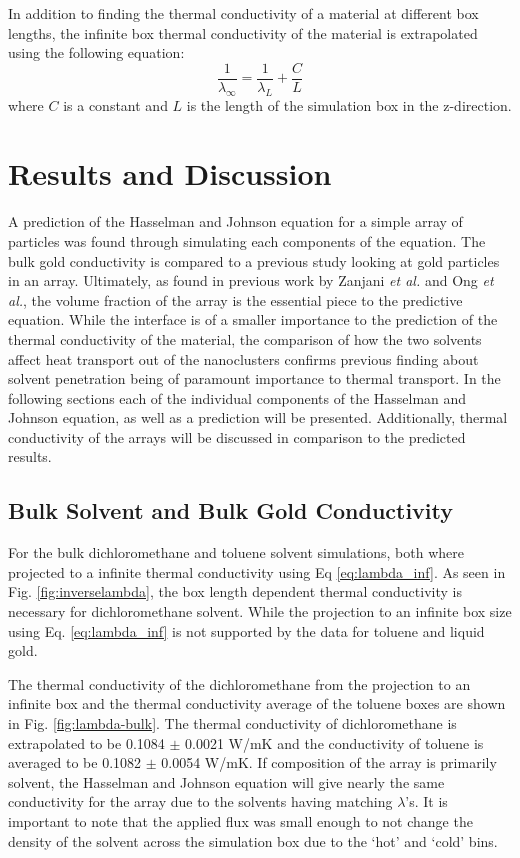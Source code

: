 In addition to finding the thermal conductivity of a material at different box lengths, the infinite box thermal conductivity of the material is extrapolated using the following equation:
\begin{equation}
    \frac{1}{\lambda_{\infty}}= \frac{1}{\lambda_L} +\frac{C}{L}
    \label{eq:lambda_inf}
\end{equation}
where $C$ is a constant and $L$ is the length of the simulation box in the z-direction.\cite{Hannah2015} 

\section{Results and Discussion}
A prediction of the Hasselman and Johnson equation for a simple array of  particles was found through simulating each components of the equation.
The bulk gold conductivity is compared to a previous study looking at gold particles in an array. 
Ultimately, as found in previous work by Zanjani \textit{et al.}\cite{Zanjani2014} and Ong \textit{et al.}\cite{Ong:2014yq}, the volume fraction of the array is the essential piece to the predictive equation.
While the interface is of a smaller importance to the prediction of the thermal conductivity of the material, the comparison of how the two solvents affect heat transport out of the nanoclusters confirms previous finding about solvent penetration being of paramount importance to thermal transport.
In the following sections each of the individual components of the Hasselman and Johnson equation, as well as a prediction will be presented.
Additionally, thermal conductivity of the arrays will be discussed in comparison to the predicted results.

\subsection{Bulk Solvent and Bulk Gold Conductivity}
For the bulk dichloromethane and toluene solvent simulations, both where projected to a infinite thermal conductivity using Eq \ref{eq:lambda_inf}. 
As seen in Fig. \ref{fig:inverselambda}, the box length dependent thermal conductivity is necessary for dichloromethane solvent.
While the projection to an infinite box size using Eq. \ref{eq:lambda_inf} is not supported by the data for toluene and liquid gold.

The thermal conductivity of the dichloromethane from the projection to an infinite box and the thermal conductivity average of the toluene boxes are shown in Fig. \ref{fig:lambda-bulk}.
The thermal conductivity of dichloromethane is extrapolated to be 0.1084 $\pm$ 0.0021 W/mK and the conductivity of toluene is averaged to be 0.1082 $\pm$ 0.0054 W/mK.
If composition of the array is primarily solvent, the Hasselman and Johnson equation will give nearly the same conductivity for the array due to the solvents having matching $
\lambda$'s.
It is important to note that the applied flux was small enough to not change the density of the solvent across the simulation box due to the `hot' and `cold' bins.

